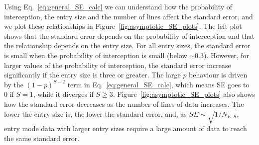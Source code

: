 \documentclass{article}
\begin{document}
Using Eq.~\eqref{eq:general_SE_calc} we can understand how the probability of interception, the entry size and the number of lines affect the standard error, and we plot these relationships in Figure~\ref{fig:asymptotic_SE_plots}. The left plot shows that the standard error depends on the probability of interception and that the relationship depends on the entry size. For all entry sizes, the standard error is small when the probability of interception is small (below \(\sim 0.3\)). However, for larger values of the probability of interception, the standard error increase significantly if the entry size is three or greater. The large \(p\) behaviour is driven by the \((1-p)^{S-2}\) term in Eq.~\eqref{eq:general_SE_calc}, which means SE goes to 0 if \(S=1\), while it diverges if \(S\geq 3\). Figure~\ref{fig:asymptotic_SE_plots} also shows how the standard error decreases as the number of lines of data increases. The lower the entry size is, the lower the standard error, and, as \(SE\sim\sqrt{1/N_{E,S}}\), entry mode data with larger entry sizes require a large amount of data to reach the same standard error. 
\end{document}
